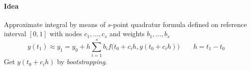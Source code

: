 \paragraph{Idea} Approximate integral by means of $s$-point quadratur formula defined on reference interval $[0,1]$ with nodes $c_1,\ldots,c_s$ and weights $b_1,\ldots,b_s$
\[
 y(t_1) \approx y_1 = y_0 +h\sum_{i=1}^s b_i f\bigl( t_0+c_ih,y(t_0+c_ih)\bigr) \qquad h = t_1 -t_0
\]
Get $y(t_0+c_ih)$ by \emph{bootstrapping}.
